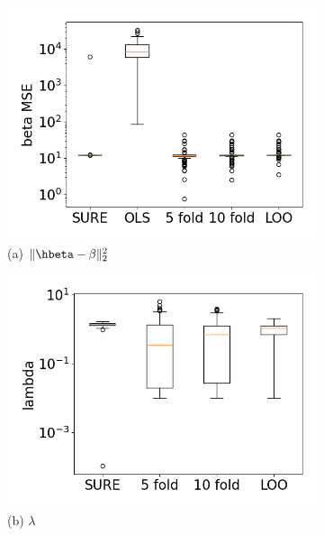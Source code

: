 \captionsetup[subfigure]{labelformat=empty}
\begin{figure}[t!]
\centering
\begin{subfigure}[b]{.32\columnwidth} 
    \includegraphics[width=\columnwidth]{../fig/collinear_mse.png}
    \caption{(a) $\|\hbeta - \beta\|_2^2$}
    \label{fig:mse}
\end{subfigure}
\hfill
\centering
\begin{subfigure}[b]{.32\columnwidth} 
    \includegraphics[width=\columnwidth]{../fig/collinear_lambda.png}
    \caption{(b) $\lambda$}
    \label{fig:lambda}
\end{subfigure}
\hfill
\centering
\begin{subfigure}[b]{.32\columnwidth} 

\end{subfigure}
\end{figure}
